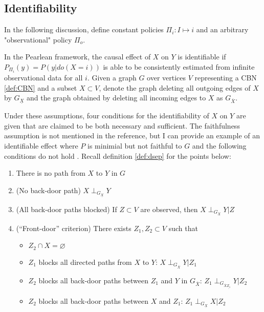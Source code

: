 \subsection{Identifiability}

In the following discussion, define constant policies $\Pi_i:I\mapsto i$ and an arbitrary "observational" policy $\Pi_o$.

In the Pearlean framework, the causal effect of $X$ on $Y$ is identifiable if $P_{\Pi_i}(y)=P(y|do(X=i))$ is able to be consistently estimated from infinite observational data for all $i$. Given a graph $G$ over vertices $V$ representing a CBN \ref{def:CBN} and a subset $X\subset V$, denote the graph deleting all outgoing edges of $X$ by $G_{\underline{X}}$ and the graph obtained by deleting all incoming edges to $X$ as $G_{\overline{X}}$.

Under these assumptions, four conditions for the identifiability of $X$ on $Y$ are given that are claimed to be both necessary and sufficient. The faithfulness assumption is not mentioned in the reference, but I can provide an example of an identifiable effect where $P$ is minimial but not faithful to $G$ and the following conditions do not hold \cite{galles_testing_2013}. Recall definition \ref{def:dsep} for the points below:

\begin{enumerate}
    \item There is no path from $X$ to $Y$ in $G$
    \item (No back-door path) $X\perp_{G_{\underline{X}}} Y$
    \item (All back-door paths blocked) If $Z\subset V$ are observed, then $X\perp_{G_{\underline{X}}} Y|Z$
    \item (``Front-door'' criterion) There exists $Z_1, Z_2 \subset V$ such that
    \begin{itemize}
        \item $Z_2\cap X =\varnothing$
        \item $Z_1$ blocks all directed paths from $X$ to $Y$: $X \perp_{G_{\overline{X}}} Y | Z_1$
        \item $Z_2$ blocks all back-door paths between $Z_1$ and $Y$ in $G_{\overline{X}}$: $Z_1 \perp_{G_{{\overline{X}}{\underline{Z_1}}}} Y | Z_2$
        \item $Z_2$ blocks all back-door paths between $X$ and $Z_1$: $Z_1 \perp_{G_{{\underline{X}}}} X | Z_2$
    \end{itemize}
\end{enumerate}

